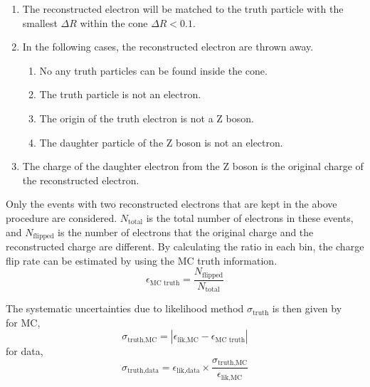 \begin{enumerate}
\item The reconstructed electron will be matched to the truth particle with the smallest $\Delta R$ within the cone $\Delta R < 0.1$.
\item In the following cases, the reconstructed electron are thrown away.
\begin{enumerate}
\item No any truth particles can be found inside the cone.
\item The truth particle is not an electron.
\item The origin of the truth electron is not a Z boson.
\item The daughter particle of the Z boson is not an electron.
\end{enumerate}
\item The charge of the daughter electron from the Z boson is the original charge of the reconstructed electron.
\end{enumerate}

Only the events with two reconstructed electrons that are kept in the above procedure are considered.
$N_{\text{total}}$ is the total number of electrons in these events, and $N_{\text{flipped}}$ is the number of electrons that the original charge and the reconstructed charge are different.
By calculating the ratio in each bin, the charge flip rate can be estimated by using the MC truth information.
\begin{equation}
\epsilon_{\text{MC truth}} = \frac{N_{\text{flipped}}}{N_{\text{total}}}
\end{equation}

The systematic uncertainties due to likelihood method $\sigma_{\text{truth}}$ is then given by \\
for MC,
\begin{equation}
\sigma_{\text{truth,MC}} = | \epsilon_{\text{lik,MC}} - \epsilon_{\text{MC truth}} |
\end{equation}
for data,
\begin{equation}
\sigma_{\text{truth,data}} = \epsilon_{\text{lik,data}} \times \frac{\sigma_{\text{truth,MC}}}{\epsilon_{\text{lik,MC}}}
\end{equation}

